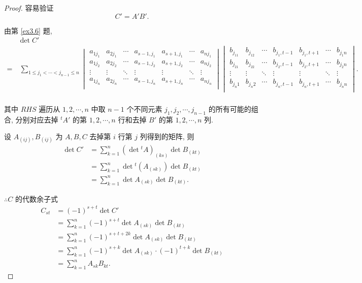 \documentclass{ctexart}
\begin{document}
\begin{proof}
    容易验证
    \[C'=A'B'.\]

    由第 \ref{ex3.6} 题,
    \setlength\arraycolsep{2pt}
    \begin{align*}
        & \det C' \\
        = & \ \sum\limits_{1\leq j_1<\cdots<j_{n-1}\leq n}\begin{vmatrix}
        a_{1j_1} & a_{2j_1} & \cdots & a_{s-1,j_1} & a_{s+1,j_1} & \cdots & a_{nj_1} \\
        a_{1j_2} & a_{2j_2} & \cdots & a_{s-1,j_2} & a_{s+1,j_2} & \cdots & a_{nj_2} \\
        \vdots   & \vdots   & \ddots & \vdots      & \vdots      & \ddots & \vdots \\
        a_{1j_n} & a_{2j_n} & \cdots & a_{s-1,j_n} & a_{s+1,j_n} & \cdots & a_{nj_n} \\
    \end{vmatrix}\begin{vmatrix}
        b_{j_11} & b_{j_12} & \cdots  & b_{j_1,t-1}  & b_{j_1,t+1} & \cdots & b_{j_1n} \\
        b_{j_21} & b_{j_22} & \cdots  & b_{j_2,t-1}  & b_{j_2,t+1} & \cdots & b_{j_2n} \\
        \vdots   & \vdots   & \ddots  & \vdots   & \vdots  & \ddots & \vdots \\
        b_{j_n1} & b_{j_n2} & \cdots  & b_{j_n,t-1}  & b_{j_n,t+1} & \cdots & b_{j_nn} \\
    \end{vmatrix}. \\
    \end{align*}

    其中 $RHS$ 遍历从 $1,2,\cdots,n$ 中取 $n-1$ 个不同元素 $j_1,j_2,\cdots,j_{n-1}$ 的所有可能的组合, 分别对应去掉 ${}^tA'$ 的第 $1,2,\cdots,n$ 行和去掉 $B'$ 的第 $1,2,\cdots,n$ 列.

    设 $A_{(ij)},B_{(ij)}$ 为 $A,B,C$ 去掉第 $i$ 行第 $j$ 列得到的矩阵, 则
    \begin{align*}
        \det C' & =\sum\limits_{k=1}^n(\det{}^tA)_{(ks)}\det B_{(kt)} \\
        & =\sum\limits_{k=1}^n\det{}^t(A_{(sk)})\det B_{(kt)} \\
        & =\sum\limits_{k=1}^n\det A_{(sk)}\det B_{(kt)}.
    \end{align*}

    $\therefore C$ 的代数余子式
    \begin{align*}
        C_{st} & =(-1)^{s+t}\det C' \\
        & =\sum\limits_{k=1}^n(-1)^{s+t}\det A_{(sk)}\det B_{(kt)} \\
        & =\sum\limits_{k=1}^n(-1)^{s+t+2k}\det A_{(sk)}\det B_{(kt)} \\
        & =\sum\limits_{k=1}^n(-1)^{s+k}\det A_{(sk)}\cdot(-1)^{t+k}\det B_{(kt)} \\
        & =\sum\limits_{k=1}^nA_{sk}B_{kt}.
    \end{align*}


\end{proof}
\end{document}

